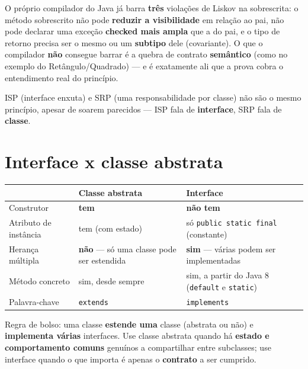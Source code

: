 \begin{cuidado}
O próprio compilador do Java já barra \textbf{três} violações de Liskov
na sobrescrita: o método sobrescrito não pode \textbf{reduzir a
visibilidade} em relação ao pai, não pode declarar uma exceção
\textbf{checked mais ampla} que a do pai, e o tipo de retorno precisa ser
o mesmo ou um \textbf{subtipo} dele (covariante). O que o compilador
\textbf{não} consegue barrar é a quebra de contrato \textbf{semântico}
(como no exemplo do Retângulo/Quadrado) --- e é exatamente ali que a
prova cobra o entendimento real do princípio.
\end{cuidado}

\begin{cuidado}
ISP (interface enxuta) e SRP (uma responsabilidade por classe) não são o
mesmo princípio, apesar de soarem parecidos --- ISP fala de
\textbf{interface}, SRP fala de \textbf{classe}.
\end{cuidado}

\section{Interface x classe abstrata}

\begin{conceito}
\begin{center}
\begin{tabular}{@{}p{3.2cm}p{4.2cm}p{4.2cm}@{}}
\toprule
& \textbf{Classe abstrata} & \textbf{Interface} \\
\midrule
Construtor & \textbf{tem} & \textbf{não tem} \\
Atributo de instância & tem (com estado) & só \texttt{public static
final} (constante) \\
Herança múltipla & \textbf{não} --- só uma classe pode ser estendida &
\textbf{sim} --- várias podem ser implementadas \\
Método concreto & sim, desde sempre & sim, a partir do Java 8
(\texttt{default} e \texttt{static}) \\
Palavra-chave & \texttt{extends} & \texttt{implements} \\
\bottomrule
\end{tabular}
\end{center}

Regra de bolso: uma classe \textbf{estende uma} classe (abstrata ou não) e
\textbf{implementa várias} interfaces. Use classe abstrata quando há
\textbf{estado e comportamento comuns} genuínos a compartilhar entre
subclasses; use interface quando o que importa é apenas o
\textbf{contrato} a ser cumprido.
\end{conceito}

